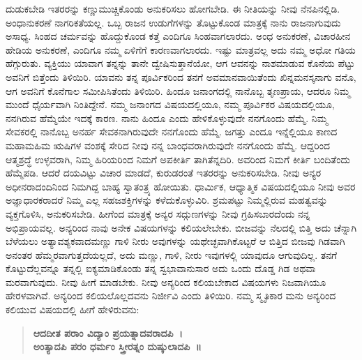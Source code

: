 ದುಡುಕಬೇಡಿ ಇತರರನ್ನು ಕಣ್ಣುಮುಚ್ಚಿಕೊಂಡು ಅನುಕರಿಸಲು ಹೋಗಬೇಡಿ. ಈ ನೀತಿಯನ್ನು ನೀವು ನೆನಪಿನಲ್ಲಿಡಿ. ಅಂಧಾನುಕರಣೆ ನಾಗರಿಕತೆಯಲ್ಲ. ಒಬ್ಬ ರಾಜನ ಉಡುಗೆಗಳನ್ನು ತೊಟ್ಟುಕೊಂಡ ಮಾತ್ರಕ್ಕೆ ನಾನು ರಾಜನಾಗುವುದು ಅಸಾಧ್ಯ. ಸಿಂಹದ ಚರ್ಮವನ್ನು ಹೊದ್ದುಕೊಂಡ ಕತ್ತೆ ಎಂದಿಗೂ ಸಿಂಹವಾಗಲಾರದು. ಅಂಧ ಅನುಕರಣೆ, ವಿಚಾರಹೀನ ಹೇಡಿಯ ಅನುಕರಣೆ, ಎಂದಿಗೂ ನಮ್ಮ ಏಳಿಗೆಗೆ ಕಾರಣವಾಗಲಾರದು. ಇಷ್ಟು ಮಾತ್ರವಲ್ಲ ಅದು ನಮ್ಮ ಅಧೋ ಗತಿಯ ಹೆಗ್ಗುರುತು. ವ್ಯಕ್ತಿಯು ಯಾವಾಗ ತನ್ನನ್ನು ತಾನೇ ದ್ವೇಷಿಸುತ್ತಾನೆಯೋ, ಆಗ ಆವನನ್ನು ನಾಶಮಾಡುವ ಕೊನೆಯ ಪೆಟ್ಟು ಅವನಿಗೆ ಬಿತ್ತೆಂದು ತಿಳಿಯಿರಿ. ಯಾವನು ತನ್ನ ಪೂರ್ವಿಕರಿಂದ ತನಗೆ ಅವಮಾನವಾಯಿತೆಂದು ಖಿನ್ನಮನಸ್ಕನಾಗು ವನೊ, ಆಗ ಅವನಿಗೆ ಕೊನೆಗಾಲ ಸಮೀಪಿಸಿತೆಂದು ತಿಳಿಯಿರಿ. ಹಿಂದೂ ಜನಾಂಗದಲ್ಲಿ ನಾನೊಬ್ಬ ತೃಣಪ್ರಾಯ, ಆದರೂ ನಿಮ್ಮ ಮುಂದೆ ಧೈರ್ಯವಾಗಿ ನಿಂತಿದ್ದೇನೆ. ನಮ್ಮ ಜನಾಂಗದ ವಿಷಯದಲ್ಲಿಯೂ, ನಮ್ಮ ಪೂರ್ವಿಕರ ವಿಷಯದಲ್ಲಿಯೂ, ನನಗಿರುವ ಹೆಮ್ಮೆಯೇ ಇದಕ್ಕೆ ಕಾರಣ. ನಾನು ಹಿಂದೂ ಎಂದು ಹೇಳಿಕೊಳ್ಳುವುದೇ ನನಗೊಂದು ಹೆಮ್ಮೆ. ನಿಮ್ಮ ಸೇವಕರಲ್ಲಿ ನಾನೊಬ್ಬ ಅನರ್ಹ ಸೇವಕನಾಗಿರುವುದೇ ನನಗೊಂದು ಹೆಮ್ಮೆ. ಜಗತ್ತು ಎಂದೂ ಇನ್ನೆಲ್ಲಿಯೂ ಕಾಣದ ಮಹಾಮಹಿಮ ಋಷಿಗಳ ವಂಶಕ್ಕೆ ಸೇರಿದ ನೀವು ನನ್ನ ಬಾಂಧವರಾಗಿರುವುದೇ ನನಗೊಂದು ಹೆಮ್ಮೆ. ಆದ್ದರಿಂದ ಆತ್ಮಶ್ರದ್ಧೆ ಉಳ್ಳವರಾಗಿ, ನಿಮ್ಮ ಹಿರಿಯರಿಂದ ನಿಮಗೆ ಅಪಕೀರ್ತಿ ತಾಗಿತೆನ್ನದಿರಿ. ಅವರಿಂದ ನಿಮಗೆ ಕೀರ್ತಿ ಬಂದಿತೆಂದು ಹೆಮ್ಮೆಪಡಿ. ಆದರೆ ದಯವಿಟ್ಟು ವಿಚಾರ ಮಾಡದೆ, ಕುರುಡರಂತೆ ಇತರರನ್ನು ಅನುಕರಿಸಬೇಡಿ. ನೀವು ಅನ್ಯರ ಅಧೀನರಾದಂದಿನಿಂದ ನಿಮಗಿದ್ದ ಬಾಹ್ಯ ಸ್ವಾತಂತ್ರ್ಯ ಹೋಯಿತು. ಧಾರ್ಮಿಕ, ಆಧ್ಯಾತ್ಮಿಕ ವಿಷಯದಲ್ಲಿಯೂ ನೀವು ಅವರ ಅಜ್ಞಾಧಾರಕರಾದರೆ ನಿಮ್ಮ ಎಲ್ಲ ಸಹಜಶಕ್ತಿಗಳನ್ನು ಕಳೆದುಕೊಳ್ಳುವಿರಿ. ಶ್ರಮಪಟ್ಟು ನಿಮ್ಮಲ್ಲಿರುವ ಮಹತ್ವವನ್ನು ವ್ಯಕ್ತಗೊಳಿಸಿ, ಅನುಕರಿಸಬೇಡಿ. ಹೀಗೆಂದ ಮಾತ್ರಕ್ಕೆ ಅನ್ಯರ ಸದ್ಗುಣಗಳನ್ನು ನೀವು ಗ್ರಹಿಸಬಾರದೆಂದು ನನ್ನ ಅಭಿಪ್ರಾಯವಲ್ಲ. ಅನ್ಯರಿಂದ ನಾವು ಅನೇಕ ವಿಷಯಗಳನ್ನು ಕಲಿಯಲೇಬೇಕು. ಬೀಜವನ್ನು ನೆಲದಲ್ಲಿ ಬಿತ್ತಿ ಅದು ಚೆನ್ನಾಗಿ ಬೆಳೆಯಲು ಅತ್ಯಾವಶ್ಯಕವಾದ\break ಮಣ್ಣು ಗಾಳಿ ನೀರು ಅವುಗಳನ್ನು ಯಥೇಚ್ಛವಾಗಿಕೊಟ್ಟರೆ ಆ ಬಿತ್ತಿದ ಬೀಜವು ಗಿಡವಾಗಿ ಅನಂತರ ಹೆಮ್ಮರವಾಗುತ್ತದೆಯಲ್ಲದೆ, ಅದು ಮಣ್ಣು, ಗಾಳಿ, ನೀರು ಇವುಗಳಲ್ಲಿ ಯಾವುದೂ ಆಗುವುದಿಲ್ಲ. ತನಗೆ ಕೊಟ್ಟುದೆಲ್ಲವನ್ನೂ ತನ್ನಲ್ಲಿ ಐಕ್ಯಮಾಡಿಕೊಂಡು ತನ್ನ ಸ್ವಭಾವಾನುಸಾರ ಅದು ಒಂದು ದೊಡ್ಡ ಗಿಡ ಅಥವಾ ಮರವಾಗುವುದು. ನೀವು ಹೀಗೆ ಮಾಡಬೇಕು. ನೀವು ಅನ್ಯರಿಂದ ಕಲಿಯಬೇಕಾದ ವಿಷಯಗಳು ನಿಜವಾಗಿಯೂ ಹೇರಳವಾಗಿವೆ. ಅನ್ಯರಿಂದ ಕಲಿಯಲೊಲ್ಲದವನು ನಿರ್ಜೀವಿ ಎಂದು ತಿಳಿಯಿರಿ. ನಮ್ಮ ಸ್ಮೃತಿಕಾರ ಮನು ಅನ್ಯರಿಂದ ಕಲಿಯುವ ವಿಷಯದಲ್ಲಿ ಹೀಗೆ ಹೇಳಿರುವನು:

\begin{verse}
\textbf{ಆದದೀತ ಪರಾಂ ವಿದ್ಯಾಂ ಪ್ರಯತ್ನಾದವರಾದಪಿ~।}\\\textbf{ಅಂತ್ಯಾದಪಿ ಪರಂ ಧರ್ಮಂ ಸ್ತ್ರೀರತ್ನಂ ದುಷ್ಕುಲಾದಪಿ~॥}
\end{verse}

